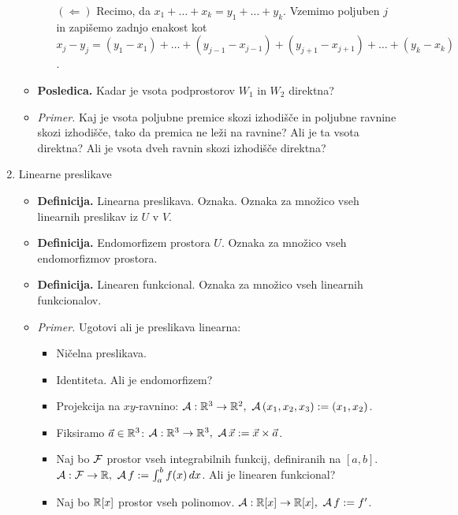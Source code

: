 \begin{enumerate}
\begin{itemize}
\begin{itemize}
            $(\Leftarrow)$ Recimo, da $x_1 + \ldots + x_k = y_1 + \ldots + y_k$. Vzemimo poljuben $j$ in zapišemo zadnjo enakost kot $x_j - y_j = (y_1 - x_1) + \ldots + (y_{j-1} - x_{j-1}) +  (y_{j+1} - x_{j+1}) + \ldots + (y_k - x_k)$. 
        \end{itemize}
        \item \colorbox{orange!30}{\textbf{Posledica.}} Kadar je vsota podprostorov $W_1$ in $W_2$ direktna?
        \item \colorbox{yellow!30}{\emph{Primer.}} Kaj je vsota poljubne premice skozi izhodišče in poljubne ravnine skozi izhodišče, tako da premica ne leži na ravnine? Ali je ta vsota direktna? Ali je vsota dveh ravnin skozi izhodišče direktna?
    \end{itemize}

    \newpage
    \item Linearne preslikave
    \begin{itemize}
        \item \colorbox{purple!30}{\textbf{Definicija.}} Linearna preslikava. Oznaka. Oznaka za množico vseh linearnih preslikav iz $U$ v $V$. 
        \item \colorbox{purple!30}{\textbf{Definicija.}} Endomorfizem prostora $U$. Oznaka za množico vseh endomorfizmov prostora.
        \item \colorbox{purple!30}{\textbf{Definicija.}} Linearen funkcional. Oznaka za množico vseh linearnih funkcionalov.
        \item \colorbox{yellow!30}{\emph{Primer.}} Ugotovi ali je preslikava linearna:   
        \begin{itemize}
            \item Ničelna preslikava.
            \item Identiteta. Ali je endomorfizem?
            \item Projekcija na $xy$-ravnino: $\mathcal{A}: \mathbb{R}^3 \to \mathbb{R}^2, \ \mathcal{A} \, (x_1, x_2, x_3) := (x_1, x_2)$.
            \item Fiksiramo $\vec{a} \in \mathbb{R}^3$: $\mathcal{A}: \mathbb{R}^3 \to \mathbb{R}^3, \ \mathcal{A} \, \vec{x} := \vec{x} \times \vec{a}$.            
            \item Naj bo $\mathcal{F}$ prostor vseh integrabilnih funkcij, definiranih na $[a,b]$. $\mathcal{A}: \mathcal{F} \to \mathbb{R}, \ \mathcal{A} \, f := \int_{a}^{b} f(x) \,dx $. Ali je linearen funkcional?            
            \item Naj bo $\mathbb{R}[x]$ prostor vseh polinomov. $\mathcal{A}: \mathbb{R}[x] \to \mathbb{R}[x], \ \mathcal{A} \, f := f'$.
        \end{itemize}

\end{itemize}
\end{enumerate}
